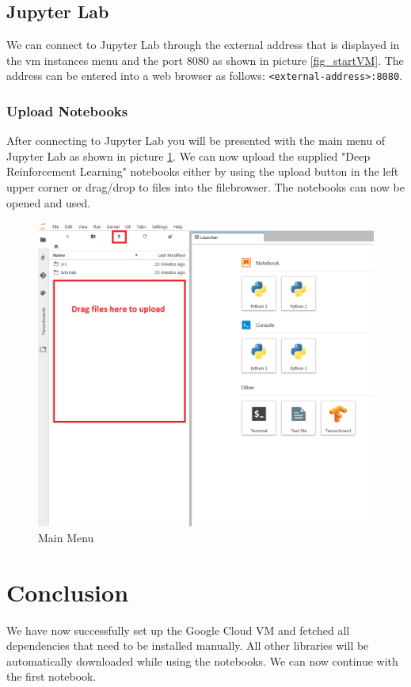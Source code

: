 \documentclass[a4paper]{article}
\begin{document}
\subsection{Jupyter Lab}
We can connect to Jupyter Lab through the external address that is displayed in the vm instances menu and the port 8080 as shown in picture \ref{fig_startVM}. The address can be entered into a web browser as follows: \lstinline|<external-address>:8080|.
\subsubsection{Upload Notebooks}
After connecting to Jupyter Lab you will be presented with the main menu of Jupyter Lab as shown in picture \ref{fig_mainMenu}. We can now upload the supplied "Deep Reinforcement Learning" notebooks either by using the upload button in the left upper corner or drag/drop to files into the filebrowser. The notebooks can now be opened and used.
\begin{figure}[H]
	\centerline{\includegraphics[width=\textwidth]{img/jupyterLab}}
	\caption{Main Menu}
	\label{fig_mainMenu}
\end{figure}
\section{Conclusion}
We have now successfully set up the Google Cloud VM and fetched all dependencies that need to be installed manually. All other libraries will be automatically downloaded while using the notebooks. We can now continue with the first notebook.

 

\end{document}
